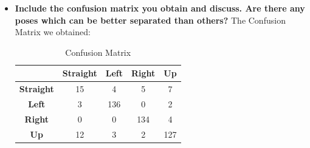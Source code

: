 \documentclass[a4paper]{article}
\begin{document}
\begin{itemize}
\item \textbf{Include the confusion matrix you obtain and discuss. Are there any poses which can be better separated than others?}
\newline \newline
The Confusion Matrix we obtained: 
\begin{table}[th]
\centering
\label{confusion_matrix_pose}
\begin{tabular}{|c|c|c|c|c|}
\hline
   & \textbf{Straight} & \textbf{Left} & \multicolumn{1}{l|}{\textbf{Right}} & \multicolumn{1}{l|}{\textbf{Up}} \\ \hline
\textbf{Straight} & 15                & 4             & 5                                   & 7                                \\ \hline
\textbf{Left}     & 3                 & 136           & 0                                   & 2                                \\ \hline
\textbf{Right}    & 0                 & 0             & 134                                 & 4                                \\ \hline
\textbf{Up}       & 12                & 3             & 2                                   & 127                              \\ \hline
\end{tabular}
\caption{Confusion Matrix}
\end{table}



\end{itemize}
\end{document}
